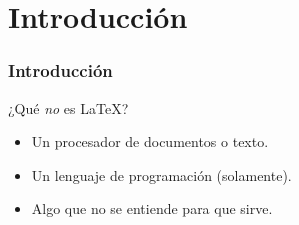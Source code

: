 \section{Introducción}\label{sec:Introducción}

\begin{frame}
    \frametitle{Introducción}
        \begin{tcolorbox}[colframe=color1]
            \begin{center}
                ¿Qué \textit{no} es \LaTeX ?
            \end{center}
        \end{tcolorbox}
        \begin{itemize}
            \item Un procesador de documentos o texto.
            \item Un lenguaje de programación (solamente).
            \item Algo que no se entiende para que sirve.
        \end{itemize}
        
    \end{frame}

